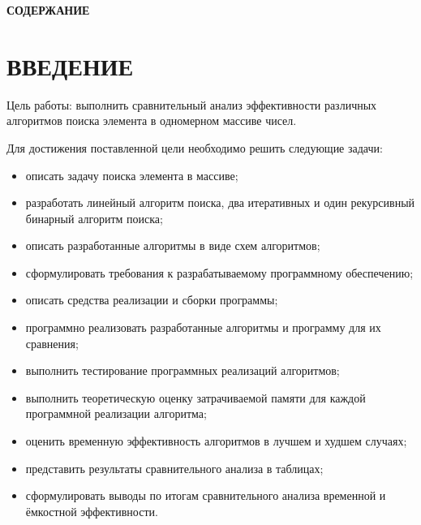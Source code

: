
\usepackage{silence}
\pgfplotsset{compat=1.18}





\clearpage
\thispagestyle{plain}
\begin{center}
    \textbf{СОДЕРЖАНИЕ}
\end{center}
\vspace{-12pt}
\makeatletter
{}
\makeatother
\clearpage

\makeatletter
{}
\makeatother
\clearpage

\chapter*{ВВЕДЕНИЕ}

Цель работы: выполнить сравнительный анализ эффективности 
различных алгоритмов поиска элемента в одномерном 
массиве чисел.

Для достижения поставленной цели необходимо решить следующие задачи:
\begin{itemize}
    \item описать задачу поиска элемента в массиве;
    \item разработать линейный алгоритм поиска, два итеративных и один рекурсивный бинарный алгоритм поиска;
    \item описать разработанные алгоритмы в виде схем алгоритмов;
    \item сформулировать требования к разрабатываемому программному обеспечению;
    \item описать средства реализации и сборки программы;
    \item программно реализовать разработанные алгоритмы и программу для их сравнения;
    \item выполнить тестирование программных реализаций алгоритмов;
    \item выполнить теоретическую оценку затрачиваемой памяти для каждой программной реализации алгоритма;
    \item оценить временную эффективность алгоритмов в лучшем и худшем случаях;
    \item представить результаты сравнительного анализа в таблицах;
    \item сформулировать выводы по итогам сравнительного анализа временной и ёмкостной эффективности.
\end{itemize}

